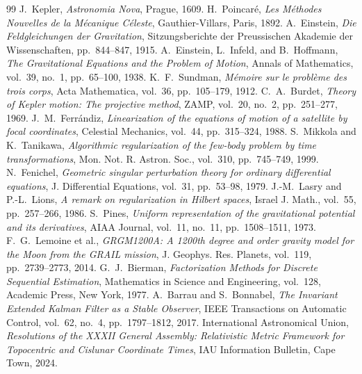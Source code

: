 \documentclass[11pt,a4paper,reqno]{article}
\theoremstyle{plain}
\theoremstyle{definition}
\theoremstyle{remark}
\numberwithin{equation}{section}
\numberwithin{table}{section}
\begin{document}
\begin{thebibliography}{99}
 J.~Kepler, \emph{Astronomia Nova}, Prague, 1609.
 H.~Poincar\'{e}, \emph{Les M\'{e}thodes Nouvelles de la M\'{e}canique C\'{e}leste}, Gauthier-Villars, Paris, 1892.
 A.~Einstein, \emph{Die Feldgleichungen der Gravitation}, Sitzungsberichte der Preussischen Akademie der Wissenschaften, pp.~844--847, 1915.
 A.~Einstein, L.~Infeld, and B.~Hoffmann, \emph{The Gravitational Equations and the Problem of Motion}, Annals of Mathematics, vol.~39, no.~1, pp.~65--100, 1938.
 K.~F.~Sundman, \emph{M\'{e}moire sur le probl\`{e}me des trois corps}, Acta Mathematica, vol.~36, pp.~105--179, 1912.
 C.~A.~Burdet, \emph{Theory of Kepler motion: The projective method}, ZAMP, vol.~20, no.~2, pp.~251--277, 1969.
 J.~M.~Ferr\'{a}ndiz, \emph{Linearization of the equations of motion of a satellite by focal coordinates}, Celestial Mechanics, vol.~44, pp.~315--324, 1988.
 S.~Mikkola and K.~Tanikawa, \emph{Algorithmic regularization of the few-body problem by time transformations}, Mon. Not. R. Astron. Soc., vol.~310, pp.~745--749, 1999.
 N.~Fenichel, \emph{Geometric singular perturbation theory for ordinary differential equations}, J. Differential Equations, vol.~31, pp.~53--98, 1979.
 J.-M.~Lasry and P.-L.~Lions, \emph{A remark on regularization in Hilbert spaces}, Israel J. Math., vol.~55, pp.~257--266, 1986.
 S.~Pines, \emph{Uniform representation of the gravitational potential and its derivatives}, AIAA Journal, vol.~11, no.~11, pp.~1508--1511, 1973.
 F.~G.~Lemoine et al., \emph{GRGM1200A: A 1200th degree and order gravity model for the Moon from the GRAIL mission}, J. Geophys. Res. Planets, vol.~119, pp.~2739--2773, 2014.
 G.~J.~Bierman, \emph{Factorization Methods for Discrete Sequential Estimation}, Mathematics in Science and Engineering, vol.~128, Academic Press, New York, 1977.
 A.~Barrau and S.~Bonnabel, \emph{The Invariant Extended Kalman Filter as a Stable Observer}, IEEE Transactions on Automatic Control, vol.~62, no.~4, pp.~1797--1812, 2017.
 International Astronomical Union, \emph{Resolutions of the XXXII General Assembly: Relativistic Metric Framework for Topocentric and Cislunar Coordinate Times}, IAU Information Bulletin, Cape Town, 2024.

\end{thebibliography}
\end{document}
